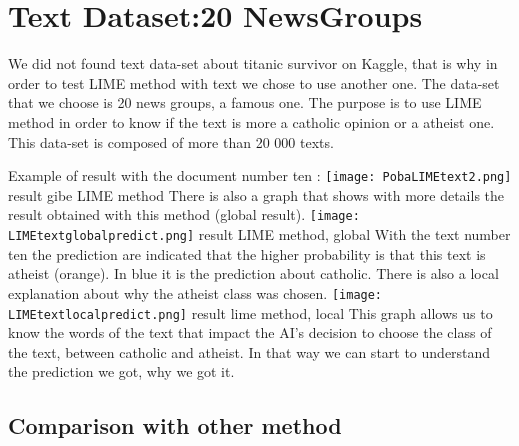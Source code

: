\documentclass[sigplan,screen]{acmart}
\begin{document}
\section{Text Dataset:20 NewsGroups}
\Large
We did not found text data-set about titanic survivor on Kaggle, that is why in order to test LIME method with text we chose to use another one. The data-set that we choose is 20 news groups, a famous one. The purpose is to use LIME method in order to know if the text is more a catholic opinion or a atheist one. This data-set is composed of more than 20 000 texts.

Example of result with the document number ten :
\newline
    \centering
        \texttt{[image: PobaLIMEtext2.png]}
        \newline
        \small result gibe LIME method
        \newline
\Larger        
There is also a graph that shows with more details the result obtained with this method (global result).
\newline
    \centering
        \texttt{[image: LIMEtextglobalpredict.png]}
        \small
        result LIME method, global
        \newline
\Large
With the text number ten the prediction are indicated that the higher probability is that this text is atheist (orange). In blue it is the prediction about catholic.
\newline
There is also a local explanation about why the atheist class was chosen.
\newline
    \centering
        \texttt{[image: LIMEtextlocalpredict.png]}
        \small
        result lime method, local
        \newline
\Larger
This graph allows us to know the words of the text that impact the AI's decision to choose the class of the text, between catholic and atheist. In that way we can start to understand the prediction we got, why we got it.

\subsection{Comparison with other method}
\end{document}
